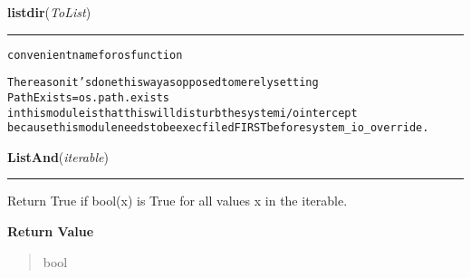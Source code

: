     \vspace{0.5ex}

\hspace{.8\funcindent}\begin{boxedminipage}{\funcwidth}

    \raggedright \textbf{listdir}(\textit{ToList})

    \vspace{-1.5ex}

    \rule{\textwidth}{0.5\fboxrule}
\setlength{\parskip}{2ex}
\begin{alltt}

convenient name for os function

The reason it's done this way as opposed to merely setting 
        PathExists = os.path.exists
in this module is that this will disturb the system i/o intercept
because this module needs to be execfiled FIRST before system\_io\_override. 
\end{alltt}

\setlength{\parskip}{1ex}
    \end{boxedminipage}

    \label{System:Utils:ListAnd}

    \vspace{0.5ex}

\hspace{.8\funcindent}\begin{boxedminipage}{\funcwidth}

    \raggedright \textbf{ListAnd}(\textit{iterable})

    \vspace{-1.5ex}

    \rule{\textwidth}{0.5\fboxrule}
\setlength{\parskip}{2ex}
    Return True if bool(x) is True for all values x in the iterable.

\setlength{\parskip}{1ex}
      \textbf{Return Value}
    \vspace{-1ex}

      \begin{quote}
      bool

      \end{quote}

    \end{boxedminipage}

    \label{System:Utils:ListOr}

